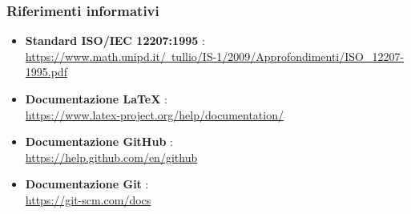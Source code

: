 		\subsubsection{Riferimenti informativi}
			\begin{itemize}
				\item\textbf{Standard ISO/IEC 12207:1995} : \\
				\href{https://www.math.unipd.it/~tullio/IS-1/2009/Approfondimenti/ISO\_12207-1995.pdf}{https://www.math.unipd.it/~tullio/IS-1/2009/Approfondimenti/ISO\_12207-1995.pdf}
				\item\textbf{Documentazione LaTeX} : \\
				\href{ https://www.latex-project.org/help/documentation/}{ https://www.latex-project.org/help/documentation/}
				\item\textbf{Documentazione GitHub} : \\
				\href{ https://help.github.com/en/github}{ https://help.github.com/en/github}
				\item\textbf{Documentazione Git} : \\
				\href{ https://git-scm.com/docs}{ https://git-scm.com/docs}
			\end{itemize}
\newpage
		
		
		
		
		
		
		
		
		
		
		
		
		
		
		
		
		
		
		
		
		
		
		
